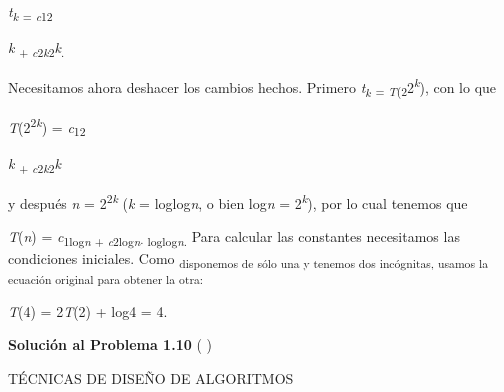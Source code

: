 \documentclass[12pt]{article}
\renewcommand{\_}{\kern-1.5pt\textunderscore\kern-1.5pt}
\begin{document}
\begin{Center}
{\fontsize{10pt}{12.0pt}\selectfont \textit{t\textsubscript{k }}\textsubscript{= \textit{c}12}{\fontsize{7pt}{8.4pt}\selectfont \textit{k }\textsubscript{+ \textit{c}2\textit{k}2}\textit{k}\textsubscript{. }{\fontsize{10pt}{12.0pt}\selectfont Necesitamos ahora deshacer los cambios hechos. Primero \textit{t\textsubscript{k }}\textsubscript{= \textit{T}(2}2\textit{\textsuperscript{k}}), con lo que \par}\par}\par}
\end{Center}\par

\begin{Center}
{\fontsize{10pt}{12.0pt}\selectfont \textit{T}(2\textsuperscript{2\textit{k}}) = \textit{c}\textsubscript{12}{\fontsize{7pt}{8.4pt}\selectfont \textit{k }\textsubscript{+ \textit{c}2\textit{k}2}\textit{k }{\fontsize{10pt}{12.0pt}\selectfont y después \textit{n }= 2\textsuperscript{2\textit{k }}(\textit{k }= loglog\textit{n}, o bien log\textit{n }= 2\textit{\textsuperscript{k}}), por lo cual tenemos que \par}\par}\par}
\end{Center}\par

\begin{Center}
{\fontsize{10pt}{12.0pt}\selectfont \textit{T}(\textit{n}) = \textit{c}\textsubscript{1log\textit{n }+ \textit{c}2log\textit{n}$ \cdot $ loglog\textit{n}. }Para calcular las constantes necesitamos las condiciones iniciales. Como \textsubscript{disponemos de sólo una y tenemos dos incógnitas, usamos la ecuación original para obtener la otra: }\par}
\end{Center}\par

{\fontsize{10pt}{12.0pt}\selectfont \textit{T}(4) = 2\textit{T}(2) + log4 = 4. \par}\par

{\fontsize{10pt}{12.0pt}\selectfont \textbf{Solución al Problema 1.10 }( ) \par}\par

{\fontsize{10pt}{12.0pt} {\fontsize{7pt}{8.4pt}\selectfont TÉCNICAS DE DISEÑO DE ALGORITMOS \par}\par}\par
\end{document}
